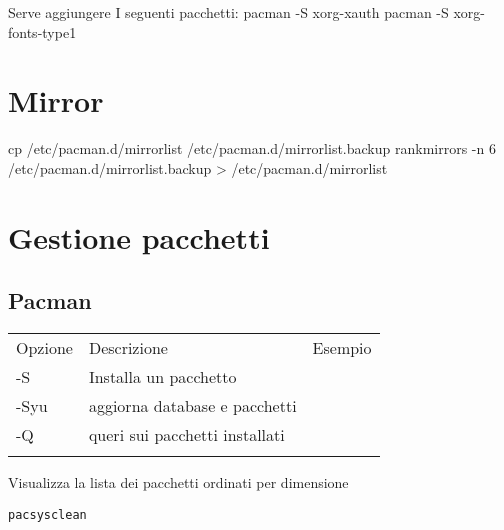 \documentclass[]{article}
\begin{document}
Serve aggiungere I seguenti pacchetti: pacman -S xorg-xauth pacman -S
xorg-fonts-type1

\section{Mirror}\label{mirror}

cp /etc/pacman.d/mirrorlist /etc/pacman.d/mirrorlist.backup rankmirrors
-n 6 /etc/pacman.d/mirrorlist.backup \textgreater{}
/etc/pacman.d/mirrorlist

\section{Gestione pacchetti}\label{gestione-pacchetti}

\subsection{Pacman}\label{pacman}

\begin{longtable}[l]{@{}lll@{}}
\toprule\addlinespace
Opzione & Descrizione & Esempio
\\\addlinespace
\midrule\endhead
-S & Installa un pacchetto
\\\addlinespace
-Syu & aggiorna database e pacchetti
\\\addlinespace
-Q & queri sui pacchetti installati
\\\addlinespace
\bottomrule
\end{longtable}

Visualizza la lista dei pacchetti ordinati per dimensione

\begin{verbatim}
pacsysclean 
\end{verbatim}
\end{document}
